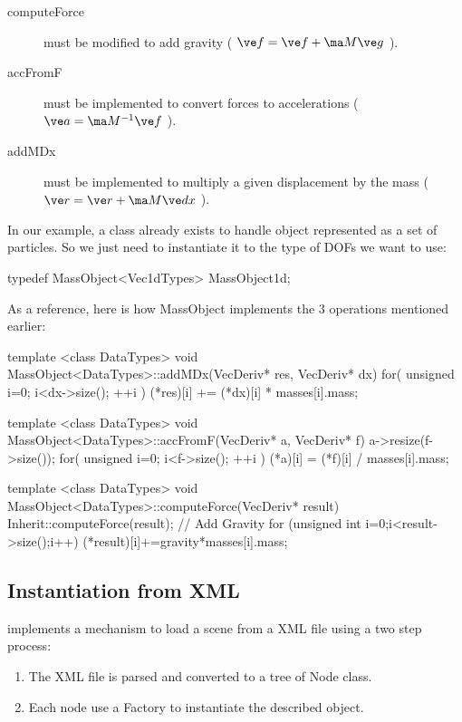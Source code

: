 \begin{description}
\item[computeForce] must be modified to add gravity ( $\ve f = \ve f + \ma M \ve g$ ).
\item[accFromF] must be implemented to convert forces to accelerations ( $\ve a = \ma M^{-1} \ve f$ ).
\item[addMDx] must be implemented to multiply a given displacement by the mass ( $ \ve r = \ve r + \ma M \ve dx$ ).
\end{description}

In our example, a class  already exists to handle object represented as a set of particles. So we just need to instantiate it to the type of DOFs we want to use:

\begin{code_cpp}
typedef MassObject<Vec1dTypes> MassObject1d;
\end{code_cpp}

As a reference, here is how MassObject implements the 3 operations mentioned earlier:

\begin{code_cpp}
template <class DataTypes>
void MassObject<DataTypes>::addMDx(VecDeriv* res, VecDeriv* dx)
{
  for( unsigned i=0; i<dx->size(); ++i )
    (*res)[i] += (*dx)[i] * masses[i].mass;
}


template <class DataTypes>
void MassObject<DataTypes>::accFromF(VecDeriv* a, VecDeriv* f)
{
  a->resize(f->size());
  for( unsigned i=0; i<f->size(); ++i )
    (*a)[i] = (*f)[i] / masses[i].mass;
}


template <class DataTypes>
void MassObject<DataTypes>::computeForce(VecDeriv* result)
{
  Inherit::computeForce(result);
  // Add Gravity
  for (unsigned int i=0;i<result->size();i++)
  {
    (*result)[i]+=gravity*masses[i].mass;
  }
}
\end{code_cpp}

\subsection{Instantiation from XML}

\sofa{} implements a mechanism to load a scene from a XML file using a two step process:

\begin{enumerate}
\item The XML file is parsed and converted to a tree of Node class.
\item Each node use a Factory to instantiate the described object.
\end{enumerate}


